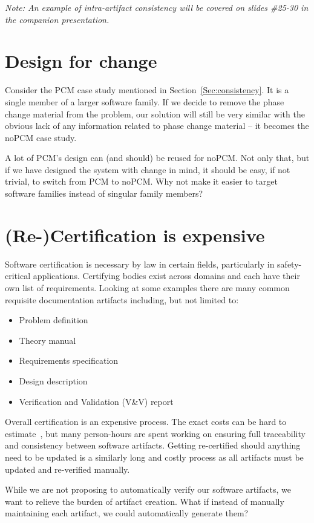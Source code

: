 \documentclass[twocolumn]{article}
\begin{document}
\emph{Note: An example of intra-artifact consistency will be covered on slides 
\#25-30 in the companion presentation.}

\section{Design for change}

Consider the PCM case study mentioned in Section~\ref{Sec:consistency}. It is a 
single member of a larger software family. If we decide to remove the phase 
change material from the problem, our solution will still be very similar with 
the obvious lack of any information related to phase change material -- it 
becomes the noPCM case study.

A lot of PCM's design can (and should) be reused for noPCM. Not only that, but 
if we have designed the system with change in mind, it should be easy, if not 
trivial, to switch from PCM to noPCM. Why not make it easier to target software 
families instead of singular family members?

\section{(Re-)Certification is expensive}

Software certification is necessary by law in certain fields, particularly in 
safety-critical applications. Certifying bodies exist across domains 
and each have their own list of requirements. Looking at some 
examples \cite{CDRH2002,CSA1999,CSA2009,FDA2014} there are many common  
requisite documentation artifacts including, but not limited to:

\begin{itemize}
\itemsep-.2em
\item Problem definition
\item Theory manual
\item Requirements specification
\item Design description
\item Verification and Validation (V\&V) report
\end{itemize}

Overall certification is an expensive process. The exact costs can be hard to 
estimate~\cite{HatcliffEtAl2009}, but many person-hours are spent 
working on ensuring full traceability and consistency between software 
artifacts. Getting re-certified should anything need to be updated is a 
similarly long and costly process as all artifacts must be updated and 
re-verified manually.

While we are not proposing to automatically verify our software artifacts, we 
want to relieve the burden of artifact creation. What if instead of manually 
maintaining each artifact, we could automatically generate them? 


  
\end{document}
